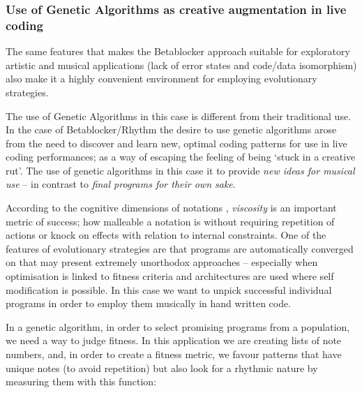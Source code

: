 \documentclass[letterpaper, 12pt]{article}
\begin{document}
\subsubsection{Use of Genetic Algorithms as creative augmentation in live coding} %
\label{sub:genetic_programming}

The same features that makes the Betablocker approach suitable for exploratory artistic and musical applications (lack of error states and code/data isomorphism) also make it a highly convenient environment for employing evolutionary strategies.

The use of Genetic Algorithms \citep{barricelli1963numerical} in this case is different from their traditional use. In the case of Betablocker/Rhythm the desire to use genetic algorithms arose from the need to discover and learn new, optimal coding patterns for use in live coding performances; as a way of escaping the feeling of being `stuck in a creative rut'. The use of genetic algorithms in this case it to provide \emph{new ideas for musical use} -- in contrast to \emph{final programs for their own sake}.



According to the cognitive dimensions of notations \citep{green1989cognitive}, \emph{viscosity} is an important metric of success; how malleable a notation is without requiring repetition of actions or knock on effects with relation to internal constraints. One of the features of evolutionary strategies are that programs are automatically converged on that may present extremely unorthodox approaches -- especially when optimisation is linked to fitness criteria and architectures are used where self modification is possible. In this case we want to unpick successful individual programs in order to employ them musically in hand written code.

In a genetic algorithm, in order to select promising programs from a population, we need a way to judge fitness. In this application we are creating lists of note numbers, and, in order to create a fitness metric, we favour patterns that have unique notes (to avoid repetition) but also look for a rhythmic nature by measuring them with this function:
\end{document}
